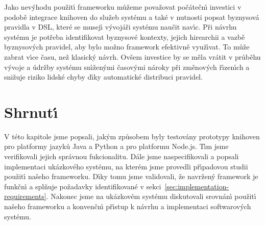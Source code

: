 Jako nev\'yhodu použit\'{\i} frameworku můžeme považovat počátečn\'{\i} investici v
podobě integrace knihoven do služeb systému a také v nutnosti popsat byznysová pravidla
v DSL, které se musej\'{\i} v\'yvojáři systému naučit nav\'{\i}c. Při návrhu systému je potřeba
identifikovat byznysové kontexty, jejich hirearchii a vazbě byznysov\'ych pravidel,
aby bylo možno framework efektivně využ\'{\i}vat. To může zabrat v\'{\i}ce času, než klasick\'y návrh.
Ovšem investice by se měla vrátit v průběhu v\'yvoje a údržby systému sn\'{\i}žen\'ymi časov\'ymi
nároky při změnov\'ych ř\'{\i}zen\'{\i}ch a snižuje riziko lidské chyby d\'{\i}ky automatické distribuci
pravidel.

\section{Shrnut\'{\i}}

V této kapitole jsme popsali, jak\'ym způsobem byly testovány prototypy knihoven
pro platformy jazyků Java a Python a pro platformu Node.js. T\'{\i}m jsme verifikovali
jejich správnou fukcionalitu. Dále jsme naspecifikovali a popsali implementaci
ukázkového systému, na kterém jsme provedli př\'{\i}padovou studii použit\'{\i} našeho
frameworku. D\'{\i}ky tomu jsme validovali, že navržen\'y framework je funkčn\'{\i}
a splňuje požadavky identifikované v sekci~\ref{sec:implementation-requirements}.
Nakonec jsme na ukázkovém systému diskutovali srovnán\'{\i} použit\'{\i} našeho frameworku
a konvenčn\'{\i} př\'{\i}stup k návrhu a implementaci softwarov\'ych systému.
